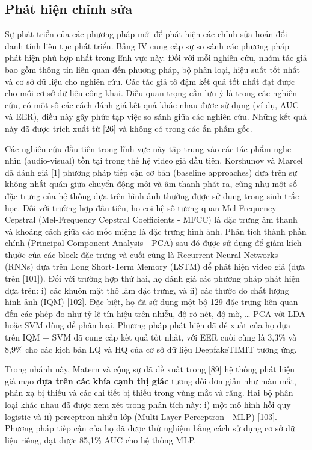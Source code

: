 \documentclass{article}
\begin{document}
\subsection{Phát hiện chỉnh sửa}

Sự phát triển của các phương pháp mới để phát hiện các chỉnh sửa hoán đổi danh tính liên tục phát triển. Bảng IV cung cấp sự so sánh các phương pháp phát hiện phù hợp nhất trong lĩnh vực này. Đối với mỗi nghiên cứu, nhóm tác giả bao gồm thông tin liên quan đến phương pháp, bộ phân loại, hiệu suất tốt nhất và cơ sở dữ liệu cho nghiên cứu. Các tác giả tô đậm kết quả tốt nhất đạt được cho mỗi cơ sở dữ liệu công khai. Điều quan trọng cần lưu ý là trong các nghiên cứu, có một số các cách đánh giá kết quả khác nhau được sử dụng (ví dụ, AUC và EER), điều này gây phức tạp việc so sánh giữa các nghiên cứu. Những kết quả này đã được trích xuất từ [26] và không có trong các ấn phẩm gốc.


Các nghiên cứu đầu tiên trong lĩnh vực này tập trung vào các tác phẩm nghe nhìn (audio-visual) tồn tại trong thế hệ video giả đầu tiên. Korshunov và Marcel đã đánh giá [1] phương pháp tiếp cận cơ bản (baseline approaches) dựa trên sự không nhất quán giữa chuyển động môi và âm thanh phát ra, cũng như một số đặc trưng của hệ thống dựa trên hình ảnh thường được sử dụng trong sinh trắc học. Đối với trường hợp đầu tiên, họ coi hệ số tương quan Mel-Frequency Cepstral (Mel-Frequency Cepstral Coefficients - MFCC) là đặc trưng âm thanh và khoảng cách giữa các mốc miệng là đặc trưng hình ảnh. Phân tích thành phần chính (Principal Component Analysis - PCA) sau đó được sử dụng để giảm kích thước của các block đặc trưng và cuối cùng là Recurrent Neural Networks (RNNs) dựa trên Long Short-Term Memory (LSTM) để phát hiện video giả (dựa trên [101]). Đối với trường hợp thứ hai, họ đánh giá các phương pháp phát hiện dựa trên: i) các khuôn mặt thô làm đặc trưng, và ii) các thước đo chất lượng hình ảnh (IQM) [102]. Đặc biệt, họ đã sử dụng một bộ 129 đặc trưng liên quan đến các phép đo như tỷ lệ tín hiệu trên nhiễu, độ rõ nét, độ mờ, … PCA với LDA hoặc SVM dùng để phân loại. Phương pháp phát hiện đã đề xuất của họ dựa trên IQM + SVM đã cung cấp kết quả tốt nhất, với EER cuối cùng là 3,3\% và 8,9\% cho các kịch bản LQ và HQ của cơ sở dữ liệu DeepfakeTIMIT tương ứng.

Trong nhánh này, Matern và cộng sự đã đề xuất trong [89] hệ thống phát hiện giả mạo \textbf{dựa trên các khía cạnh thị giác} tương đối đơn giản như màu mắt, phản xạ bị thiếu và các chi tiết bị thiếu trong vùng mắt và răng. Hai bộ phân loại khác nhau đã được xem xét trong phân tích này: i) một mô hình hồi quy logistic và ii) perceptron nhiều lớp (Multi Layer Perceptron - MLP) [103]. Phương pháp tiếp cận của họ đã được thử nghiệm bằng cách sử dụng cơ sở dữ liệu riêng, đạt được 85,1\% AUC cho hệ thống MLP.
\end{document}
